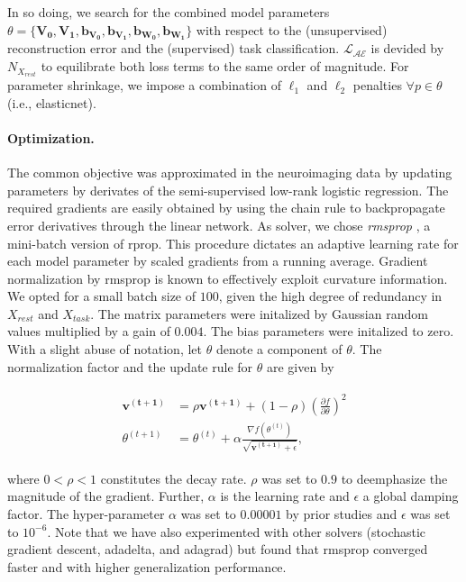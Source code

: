 \documentclass{article} %
\begin{document}
In so doing, we search for the combined model parameters
$\theta=\{\mathbf{V_0,V_1,b_{V_0}, b_{V_1}, b_{W_0}, b_{W_1}}\}$
with respect to the (unsupervised) reconstruction error and the
(supervised) task classification.
${\mathcal{L_{AE}}}$ is devided by ${N_{X_{rest}}}$ to equilibrate both
loss terms to the same order of magnitude.
For parameter shrinkage, we
impose a combination of $\ell_1$ and $\ell_2$ penalties
$\forall p \in \theta$ (i.e., elasticnet).

\paragraph{Optimization.}
The common objective was approximated 
in the neuroimaging data
by updating parameters by derivates 
of the 
semi-supervised low-rank logistic regression.
The required gradients are easily obtained by using the chain rule to
backpropagate error derivatives through the linear network.
As solver, we chose \textit{rmsprop} \cite{rmsprop},
a mini-batch version of rprop.
This procedure dictates an adaptive learning rate
for each model parameter by
scaled gradients from a running average.
Gradient normalization by rmsprop
is known to effectively exploit curvature information.
We opted for a small batch size of $100$, given the high degree of
redundancy in $X_{rest}$ and $X_{task}$.
The matrix parameters were initalized by Gaussian random values multiplied
by a gain of $0.004$. The bias parameters were initalized to zero.
With a slight abuse of notation, let $\theta$ denote a component of $\theta$.
The normalization factor and the update rule for $\theta$
are given by

\begin{eqnarray}
  \begin{split}
    \mathbf{v^{(t+1)}} &= \rho \mathbf{v^{(t+1)}} + (1 - \rho)\left(\frac{\partial f}{\partial \theta}\right)^2
\\
\theta^{(t+1)} &= \theta^{(t)} + \alpha \frac{\nabla f(\theta^{(t)})}{\sqrt{\mathbf{v^{(t+1)}} + \epsilon}},
  \end{split}
\end{eqnarray}

where $0 < \rho < 1$ constitutes the decay rate. $\rho$ was set to
$0.9$ to deemphasize the magnitude of the gradient.
Further, $\alpha$ is the learning rate and $\epsilon$ a global damping factor.
The hyper-parameter $\alpha$ was set to $0.00001$ by prior studies and $\epsilon$ was set to $10^{-6}$.
%
Note that we have also experimented with other solvers
(stochastic gradient descent, adadelta, and adagrad) but found that
rmsprop converged faster and with higher generalization performance.
\end{document}
